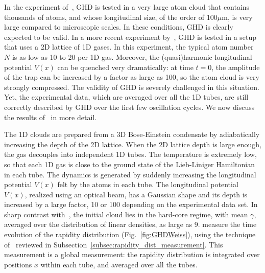 \documentclass[onecolumn,amsfonts,showpacs,superscriptaddress]{revtex4-1}
\begin{document}
In the experiment of~\cite{schemmer2019generalized}, GHD is tested in a very large atom cloud that contains thousands of atoms, and whose longitudinal size, of the order of 100$\mu$m, is very large compared to microscopic scales. In these conditions, GHD is clearly expected to be valid. In a more recent experiment by~\cite{malvania2020generalized}, GHD is tested in a setup that uses a 2D lattice of 1D gases. In this experiment, the typical atom number $N$ is as low as 10 to 20 per 1D gas. Moreover, the (quasi)harmonic longitudinal potential $V(x)$ can be quenched very dramatically: at time $t=0$, the amplitude of the trap can be increased by a factor as large as 100, so the atom cloud is very strongly compressed. The validity of GHD is severely challenged in this situation. Yet, the experimental data, which are averaged over all the 1D tubes, are still correctly described by GHD over the first few oscillation cycles. We now discuss the results of~\cite{malvania2020generalized} in more detail.



The 1D clouds are prepared from a 3D Bose-Einstein condensate by adiabatically increasing the depth of the 2D lattice. When the 2D lattice depth is large enough, the gas decouples into independent 1D tubes. The temperature is extremely low, so that each 1D gas is close to the ground state of the Lieb-Liniger Hamiltonian in each tube. The dynamics is generated by suddenly increasing the longitudinal potential $V(x)$ felt by the atoms in each tube. The longitudinal potential $V(x)$, realized using an optical beam, has a Gaussian shape and its depth is increased by a large factor, 10 or 100 depending on the experimental data set. In sharp contrast with~\citep{schemmer2019generalized}, the initial cloud lies in the hard-core regime, with mean $\gamma$, averaged over the distribution of linear densities, as large as 9. \cite{malvania2020generalized} measure the time evolution of the rapidity distribution (Fig.~\ref{fig:GHDWeiss}), using the technique of~\citep{wilson_observation_2020} reviewed in Subsection~\ref{subsec:rapidity_dist_measurement}. This measurement is a global measurement: the rapidity distribution is integrated over positions $x$ within each tube, and averaged over all the tubes.
\end{document}
